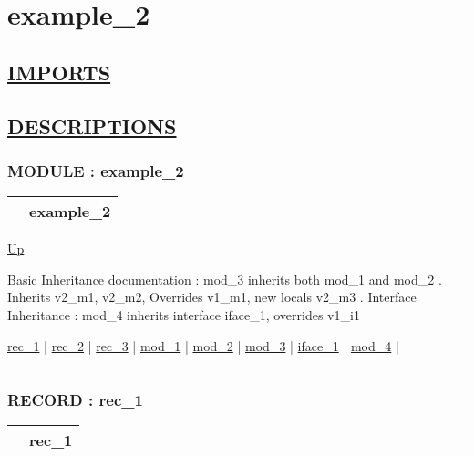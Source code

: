\chapter*{example\_2}
\hypertarget{ecldoc:toc:example_2}{}

\section*{\underline{IMPORTS}}

\section*{\underline{DESCRIPTIONS}}
\subsection*{MODULE : example\_2}
\hypertarget{ecldoc:example_2}{}

{\renewcommand{\arraystretch}{1.5}
\begin{tabularx}{\textwidth}{|>{\raggedright\arraybackslash}l|X|}
\hline
\hspace{0pt} & example\_2 \\
\hline
\end{tabularx}
}

\hyperlink{ecldoc:toc:root}{Up}

\par
Basic Inheritance documentation : mod\_3 inherits both mod\_1 and mod\_2 . Inherits v2\_m1, v2\_m2, Overrides v1\_m1, new locals v2\_m3 . Interface Inheritance : mod\_4 inherits interface iface\_1, overrides v1\_i1


\hyperlink{ecldoc:example_2.rec_1}{rec\_1}  |
\hyperlink{ecldoc:example_2.rec_2}{rec\_2}  |
\hyperlink{ecldoc:example_2.rec_3}{rec\_3}  |
\hyperlink{ecldoc:example_2.mod_1}{mod\_1}  |
\hyperlink{ecldoc:example_2.mod_2}{mod\_2}  |
\hyperlink{ecldoc:example_2.mod_3}{mod\_3}  |
\hyperlink{ecldoc:example_2.iface_1}{iface\_1}  |
\hyperlink{ecldoc:example_2.mod_4}{mod\_4}  |

\rule{\textwidth}{0.4pt}

\subsection*{RECORD : rec\_1}
\hypertarget{ecldoc:example_2.rec_1}{}

{\renewcommand{\arraystretch}{1.5}
\begin{tabularx}{\textwidth}{|>{\raggedright\arraybackslash}l|X|}
\hline
\hspace{0pt} & rec\_1 \\
\hline
\end{tabularx}
}

